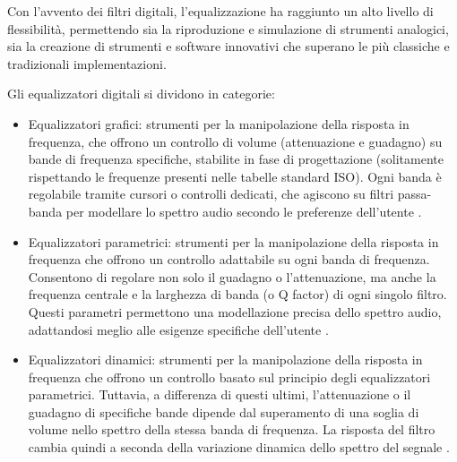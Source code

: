 \documentclass[12pt]{report}
\begin{document}
Con l’avvento dei filtri digitali, l’equalizzazione ha raggiunto un alto livello di flessibilità, permettendo sia la riproduzione e simulazione di strumenti analogici, sia la creazione di strumenti e software innovativi che superano le
più classiche e tradizionali implementazioni.

Gli equalizzatori digitali si dividono in categorie:
\begin{itemize}
    \item Equalizzatori grafici: strumenti per la manipolazione della risposta in frequenza, che offrono un controllo di volume (attenuazione e guadagno) su bande di frequenza specifiche, stabilite in fase di progettazione (solitamente rispettando le frequenze presenti nelle tabelle standard ISO). Ogni banda è regolabile tramite cursori o controlli dedicati, che agiscono su filtri passa-banda per modellare lo spettro audio secondo le preferenze dell'utente \parencite{liski2017quest}.
    \item Equalizzatori parametrici: strumenti per la manipolazione della risposta in frequenza che offrono un controllo adattabile su ogni banda di frequenza. Consentono di regolare non solo il guadagno o l'attenuazione, ma anche la frequenza centrale e la larghezza di banda (o Q factor) di ogni singolo filtro. Questi parametri permettono una modellazione precisa dello spettro audio, adattandosi meglio alle esigenze specifiche dell'utente \parencite{massenburg1972parametric}.
    \item Equalizzatori dinamici: strumenti per la manipolazione della risposta in frequenza che offrono un controllo basato sul principio degli equalizzatori parametrici. Tuttavia, a differenza di questi ultimi, l'attenuazione o il guadagno di specifiche bande dipende dal superamento di una soglia di volume nello spettro della stessa banda di frequenza. La risposta del filtro cambia quindi a seconda della variazione dinamica dello spettro del segnale \parencite{martignon2023dynamic}.
\end{itemize}
\end{document}

